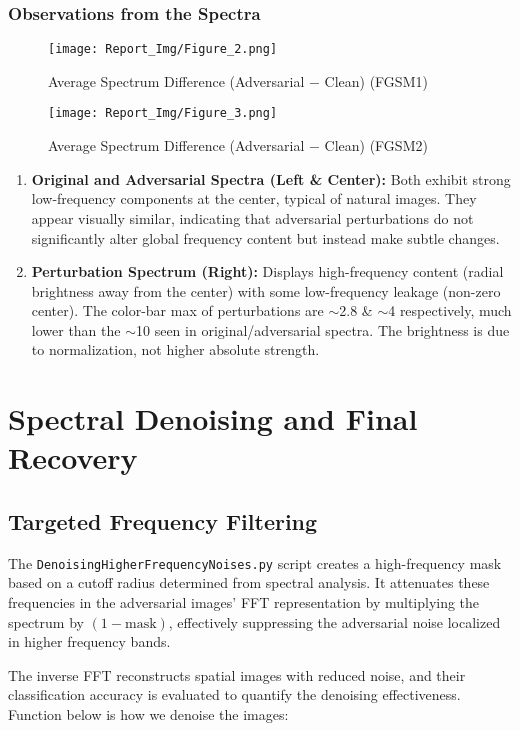 \documentclass[a4paper,12pt]{report}%
\begin{document}
\subsection{Observations from the Spectra}
\begin{figure}[H]
\centering
\texttt{[image: Report\_Img/Figure\_2.png]}
\caption{Average Spectrum Difference (Adversarial − Clean) (FGSM1)}
\end{figure}

\begin{figure}[H]
\centering
\texttt{[image: Report\_Img/Figure\_3.png]}
\caption{Average Spectrum Difference (Adversarial − Clean) (FGSM2)}
\end{figure}

\begin{enumerate}
    \item \textbf{Original and Adversarial Spectra (Left \& Center):} Both exhibit strong low-frequency components at the center, typical of natural images. They appear visually similar, indicating that adversarial perturbations do not significantly alter global frequency content but instead make subtle changes.

    \item \textbf{Perturbation Spectrum (Right):} Displays high-frequency content (radial brightness away from the center) with some low-frequency leakage (non-zero center). The color-bar max of perturbations are $\sim$2.8 \& $\sim$4 respectively, much lower than the $\sim$10 seen in original/adversarial spectra. The brightness is due to normalization, not higher absolute strength.
\end{enumerate}


\chapter{Spectral Denoising and Final Recovery}
\section{Targeted Frequency Filtering}
The \texttt{DenoisingHigherFrequencyNoises.py} script creates a high-frequency mask based on a cutoff radius determined from spectral analysis. It attenuates these frequencies in the adversarial images’ FFT representation by multiplying the spectrum by \((1 - \text{mask})\), effectively suppressing the adversarial noise localized in higher frequency bands.

The inverse FFT reconstructs spatial images with reduced noise, and their classification accuracy is evaluated to quantify the denoising effectiveness. Function below is how we denoise the images:
\end{document}
